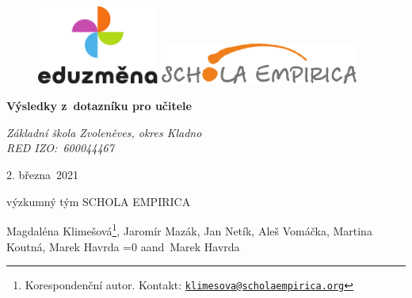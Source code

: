 \documentclass[12pt,a4paper,]{report}
\newcommand{\tr}[2]{\ifnum\pdfstrcmp{\languagename}{czech}=0 #1\else #2\fi}
\begin{document}
\begin{titlepage}
    \begin{center}

      \onehalfspacing

      \vspace*{1cm}

      \begin{figure}
      \centering
            \includegraphics[width=4cm]{logos/eduzmena}%
      \hspace{1.5cm}%
            \includegraphics[width=6.5cm]{logos/schola}%
      \end{figure}

      \vspace{1cm}

      \textbf{\huge Výsledky z~dotazníku pro učitele}

      \vspace{.25cm}

      \textit{\Large Základní škola Zvoleněves, okres Kladno\\
RED IZO:~600044467}

      \vspace{1cm}

      \large

      2. března~2021

      \vspace{1cm}

      výzkumný tým SCHOLA EMPIRICA

      \vspace{.25cm}

            Magdaléna Klimešová\footnote{Korespondenční autor. Kontakt: \href{mailto:klimesova@scholaempirica.org}{\nolinkurl{klimesova@scholaempirica.org}}}, Jaromír Mazák, Jan Netík, Aleš Vomáčka, Martina Koutná, Marek Havrda \tr{a}{and}~Marek Havrda
      
      
      \vspace{1.5cm}

    \end{center}
\end{titlepage}
\end{document}
